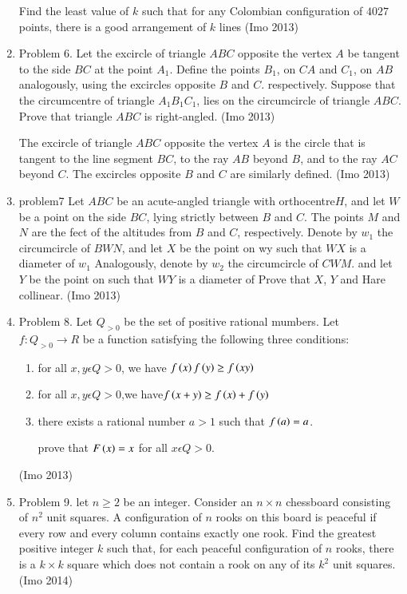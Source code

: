 \begin{enumerate}
Find the least value of $k$ such that for any Colombian configuration of $4027$ points, there is a good arrangement of $k$ lines \hfill(Imo 2013)
\item Problem 6. Let the excircle of triangle $ABC$ opposite the vertex $A$ be tangent to the side $BC$ at the point $A_1$. Define the points $B_1$, on $CA$ and $C_1$, on $AB$ analogously, using the excircles opposite $B$ and $C$. respectively. Suppose that the circumcentre of triangle $A_1B_1C_1$, lies on the circumcircle of triangle $ABC$. Prove that triangle $ABC$ is right-angled. \hfill(Imo 2013)
                        
	The excircle of triangle $ABC$ opposite the vertex $A$ is the circle that is tangent to the line segment $BC$, to the ray $AB$ beyond $B$, and to the ray $AC$ beyond $C$. The excircles opposite $B$ and $C$ are similarly defined. \hfill(Imo 2013)
\item problem7 Let $ABC$ be an acute-angled triangle with orthocentre$ H$, and let $W$ be a point on the side $BC$, lying strictly between $B$ and $C$. The points $M$ and $N$ are the fect of the altitudes from $B$ and $C$, respectively. Denote by $w_1$ the circumcircle of $BWN$, and let $X$ be the point on wy such that $WX$ is a diameter of $w_1$ Analogously, denote by $w_2$ the circumcircle of $CWM$. and let $Y$ be the point on such that $WY$ is a diameter of Prove that $X$, $Y$ and Hare collinear. \hfill(Imo 2013)
	
\item Problem 8. Let $ Q_{>0}$ be the set of positive rational mumbers. Let $f: Q_{>0} \rightarrow R$ be a function satisfying the following three conditions:
	\begin{enumerate}
		\item for all $x,y\epsilon  Q>0$, we have $f\left(x\right) f\left(y\right) \geq  f\left(xy\right)$
		\item for all $x,y\epsilon Q>0$,we have$f\left(x+y\right) \geq f\left(x\right)+f\left(y\right)$
		\item there exists a rational number $a> 1$ such that $f\left(a\right)=a$.
			
		prove that $F\left(x\right)=x$ for all $x \epsilon Q>0$.
	\end{enumerate} \hfill(Imo 2013)			
\item Problem 9. let $n\geq 2$ be an integer. Consider an $n\times n$ chessboard consisting of $n^2$ unit squares. A configuration of $n$ rooks on this board is peaceful if every row and every column contains exactly one rook. Find the greatest positive integer $k$ such that, for each peaceful configuration of $n$ rooks, there is a $k\times k$ square which does not contain a rook on any of its $k^2$ unit squares. \hfill(Imo 2014)
	

\end{enumerate}
